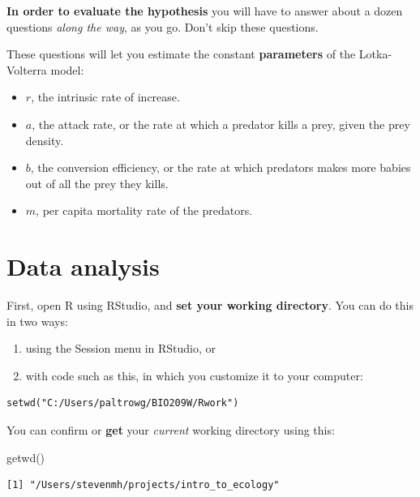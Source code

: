 \documentclass[
  letterpaper,
  DIV=11,
  numbers=noendperiod]{scrreprt}
\newenvironment{Shaded}{\begin{snugshade}}{\end{snugshade}}
\newcommand{\FunctionTok}[1]{\textcolor[rgb]{0.28,0.35,0.67}{#1}}
\newcommand{\NormalTok}[1]{\textcolor[rgb]{0.00,0.23,0.31}{#1}}
\providecommand{\tightlist}{%
  \setlength{\itemsep}{0pt}\setlength{\parskip}{0pt}}
\begin{document}
\textbf{In order to evaluate the hypothesis} you will have to answer
about a dozen questions \emph{along the way}, as you go. Don't skip
these questions.

These questions will let you estimate the constant \textbf{parameters}
of the Lotka-Volterra model:

\begin{itemize}
\tightlist
\item
  \(r\), the intrinsic rate of increase.
\item
  \(a\), the attack rate, or the rate at which a predator kills a prey,
  given the prey density.
\item
  \(b\), the conversion efficiency, or the rate at which predators makes
  more babies out of all the prey they kills.
\item
  \(m\), per capita mortality rate of the predators.
\end{itemize}

\section{Data analysis}\label{data-analysis-1}

First, open R using RStudio, and \textbf{set your working directory}.
You can do this in two ways:

\begin{enumerate}
\def\labelenumi{\arabic{enumi}.}
\tightlist
\item
  using the Session menu in RStudio, or
\item
  with code such as this, in which you customize it to your computer:
\end{enumerate}

\begin{verbatim}
setwd("C:/Users/paltrowg/BIO209W/Rwork")
\end{verbatim}

You can confirm or \textbf{get} your \emph{current} working directory
using this:

\begin{Shaded}
\begin{Highlighting}[]
\FunctionTok{getwd}\NormalTok{()}
\end{Highlighting}
\end{Shaded}

\begin{verbatim}
[1] "/Users/stevenmh/projects/intro_to_ecology"
\end{verbatim}
\end{document}
